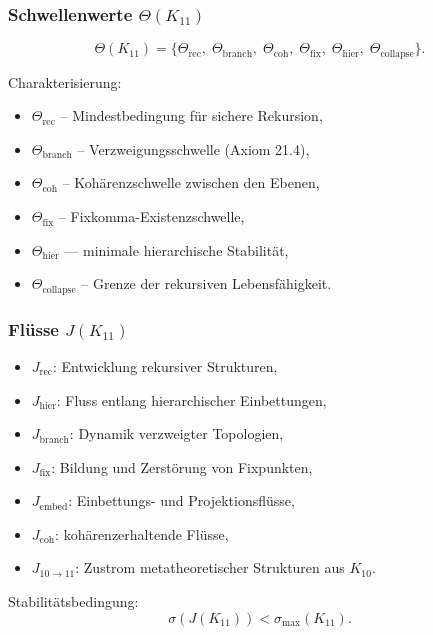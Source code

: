 \subsubsection{Schwellenwerte $\Theta(K_{11})$}

\[
\Theta(K_{11})=
\{
\Theta_{\mathrm{rec}},\;
\Theta_{\mathrm{branch}},\;
\Theta_{\mathrm{coh}},\;
\Theta_{\mathrm{fix}},\;
\Theta_{\mathrm{hier}},\;
\Theta_{\mathrm{collapse}}
\}.
\]

Charakterisierung:
\begin{itemize}
    \item $\Theta_{\mathrm{rec}}$ – Mindestbedingung für sichere Rekursion,
    \item $\Theta_{\mathrm{branch}}$ – Verzweigungsschwelle (Axiom 21.4),
    \item $\Theta_{\mathrm{coh}}$ – Kohärenzschwelle zwischen den Ebenen,
    \item $\Theta_{\mathrm{fix}}$ – Fixkomma-Existenzschwelle,
    \item $\Theta_{\mathrm{hier}}$ — minimale hierarchische Stabilität,
    \item $\Theta_{\mathrm{collapse}}$ – Grenze der rekursiven Lebensfähigkeit.
\end{itemize}

\subsubsection{Flüsse $J(K_{11})$}

\begin{itemize}
    \item $J_{\mathrm{rec}}$: Entwicklung rekursiver Strukturen,
    \item $J_{\mathrm{hier}}$: Fluss entlang hierarchischer Einbettungen,
    \item $J_{\mathrm{branch}}$: Dynamik verzweigter Topologien,
    \item $J_{\mathrm{fix}}$: Bildung und Zerstörung von Fixpunkten,
    \item $J_{\mathrm{embed}}$: Einbettungs- und Projektionsflüsse,
    \item $J_{\mathrm{coh}}$: kohärenzerhaltende Flüsse,
    \item $J_{10\to11}$: Zustrom metatheoretischer Strukturen aus $K_{10}$.
\end{itemize}

Stabilitätsbedingung:
\[
\sigma(J(K_{11})) < \sigma_{\max}(K_{11}).
\]

